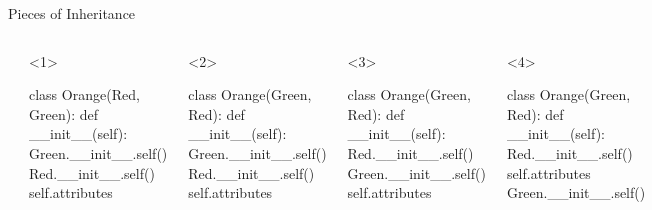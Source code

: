 \documentclass[pdf, aspectratio=169, 12pt]{beamer}
\begin{document}
\begin{frame}[fragile]{Pieces of Inheritance}
\begin{columns}
\begin{center}
	\end{center}
		
		\begin{onlyenv}<1>
			\begin{pythoncode}
				class Orange(Red, Green):
					def __init__(self):
						Green.__init__.self()
						Red.__init__.self()
						self.attributes
			\end{pythoncode}
		\end{onlyenv}
		\begin{onlyenv}<2>
			\begin{pythoncode}
				class Orange(Green, Red):
					def __init__(self):
						Green.__init__.self()
						Red.__init__.self()
						self.attributes
			\end{pythoncode}
		\end{onlyenv}
		\begin{onlyenv}<3>
			\begin{pythoncode}
				class Orange(Green, Red):
					def __init__(self):
						Red.__init__.self()
						Green.__init__.self()
						self.attributes
			\end{pythoncode}
		\end{onlyenv}
		\begin{onlyenv}<4>
			\begin{pythoncode}
				class Orange(Green, Red):
					def __init__(self):
						Red.__init__.self()
						self.attributes
						Green.__init__.self()
			\end{pythoncode}
		\end{onlyenv}
	\end{columns}
\end{frame}
\end{document}

